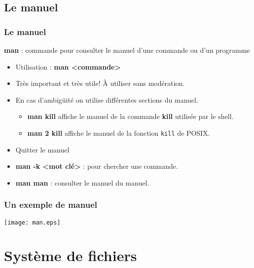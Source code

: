 \documentclass{beamer}
\begin{document}
    \subsection{Le manuel}
    \begin{frame}
        \frametitle{Le manuel}
        {\bf man} : commande pour consulter le manuel d'une commande ou d'un programme
        \begin{itemize}
            \item Utilisation : {\bf man <commande>}
            \item Très important et très utile! À utiliser sans modération.
            \item En cas d'ambigüité on utilise différentes sections du manuel.
                \begin{itemize}
                    \item {\bf man kill} affiche le manuel de la commande {\bf kill} utilisée par le shell.
                    \item {\bf man 2 kill} affiche le manuel de la fonction \texttt{kill} de POSIX.
                \end{itemize}
            \item Quitter le manuel 
            \item {\bf man -k <mot clé>} : pour chercher une commande.
            \item {\bf man man} : consulter le manuel du manuel.
        \end{itemize}
    \end{frame}

    \begin{frame}
        \frametitle{Un exemple de manuel}
        \texttt{[image: man.eps]}
    \end{frame}
    
    \section{Système de fichiers}
\end{document}
